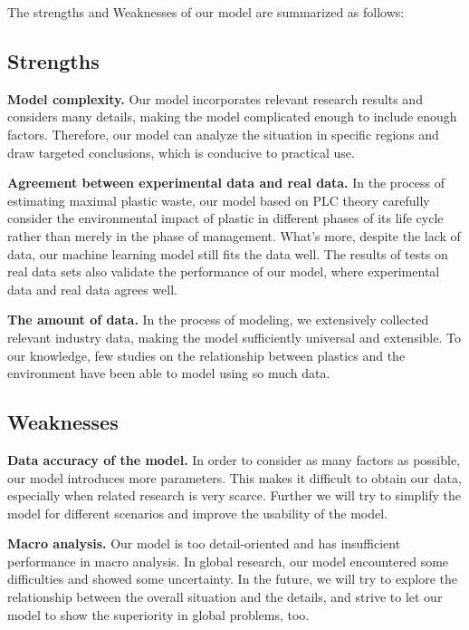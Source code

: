\documentclass{mcmthesis}
\begin{document}

The strengths and Weaknesses of our model are summarized as follows:

\subsection{Strengths}

\textbf{Model complexity.} Our model incorporates relevant research results and considers many details, making the model complicated enough to include enough factors. Therefore, our model can analyze the situation in specific regions and draw targeted conclusions, which is conducive to practical use.

\textbf{Agreement between experimental data and real data.} In the process of estimating maximal plastic waste, our model based on PLC theory carefully consider the environmental impact of plastic in different phases of its life cycle rather than merely in the phase of management. What's more, despite the lack of data, our machine learning model still fits the data well. The results of tests on real data sets also validate the performance of our model, where experimental data and real data agrees well. 

\textbf{The amount of data.} In the process of modeling, we extensively collected relevant industry data, making the model sufficiently universal and extensible. To our knowledge, few studies on the relationship between plastics and the environment have been able to model using so much data.

\subsection{Weaknesses}

\textbf{Data accuracy of the model.} In order to consider as many factors as possible, our model introduces more parameters. This makes it difficult to obtain our data, especially when related research is very scarce. Further we will try to simplify the model for different scenarios and improve the usability of the model.

\textbf{Macro analysis.} Our model is too detail-oriented and has insufficient performance in macro analysis. In global research, our model encountered some difficulties and showed some uncertainty. In the future, we will try to explore the relationship between the overall situation and the details, and strive to let our model to show the superiority in global problems, too.
\end{document}
